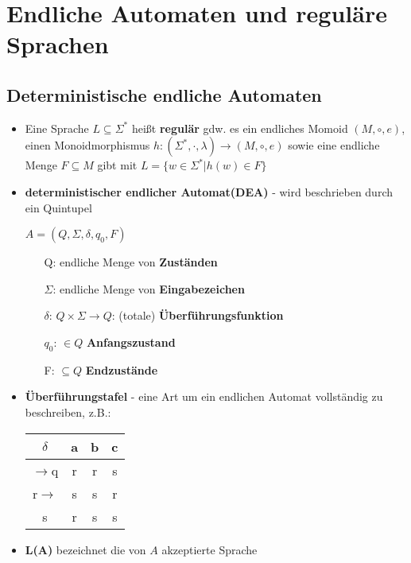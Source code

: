 \documentclass[12pt, a4paper]{article}
\begin{document}
	\section{Endliche Automaten und reguläre Sprachen}
	\subsection{Deterministische endliche Automaten}
	\begin{itemize}
		\item Eine Sprache $L\subseteq\Sigma^{*}$ heißt \textbf{regulär} gdw. es ein endliches Momoid $(M,\circ,e)$, einen Monoidmorphismus $h:(\Sigma^{*},\cdot,\lambda)\rightarrow(M,\circ,e)$ sowie eine endliche Menge $F\subseteq M$ gibt mit $L=\{w\in\Sigma^{*}|h(w)\in F\}$
		
		\item \textbf{deterministischer endlicher Automat(DEA)} - wird beschrieben durch ein Quintupel
		\begin{center}
			$A=(Q,\Sigma,\delta,q_{0},F)$
		\end{center}
		\begin{itemize}
			\item[Q:] endliche Menge von \textbf{Zuständen}
			\item[$\Sigma$:] endliche Menge von \textbf{Eingabezeichen}
			\item[$\delta$:] $Q\times\Sigma\rightarrow Q$: (totale) \textbf{Überführungsfunktion}
			\item[$q_{0}$:] $\in Q$ \textbf{Anfangszustand}
			\item[F:] $\subseteq Q$ \textbf{Endzustände}
		\end{itemize}
		
		\item \textbf{Überführungstafel} - eine Art um ein endlichen Automat vollständig zu beschreiben, z.B.:
		\begin{center}
			\begin{tabular}{c||c c c}
				$\delta$ & a & b & c \\
				\hline \hline
				$\rightarrow$q & r & r & s \\
				r$\rightarrow$ & s & s & r \\
				s & r & s & s \\
			\end{tabular}
		\end{center}
		
		\item \textbf{L(A)} bezeichnet die von $A$ akzeptierte Sprache
		

\end{itemize}
\end{document}
